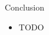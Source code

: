\documentclass[final,hyperref={pdfpagelabels=false}]{beamer}
\begin{document}
\begin{frame}[t]
\begin{columns}[t]
\begin{column}{.465\textwidth}

     


\begin{block}{Conclusion}

\begin{itemize}
\item TODO
\end{itemize}

\end{block}



\end{column}
\end{columns}
\end{frame}
\end{document}
